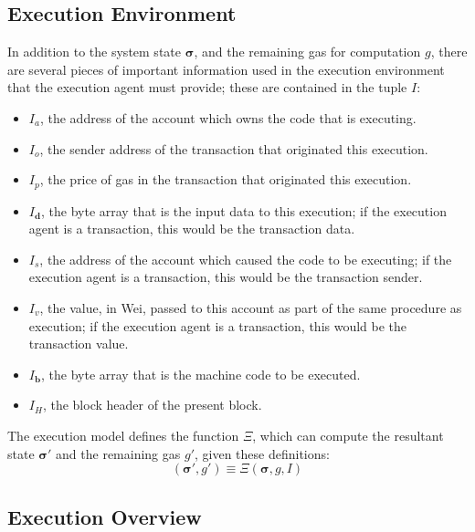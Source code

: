 \documentclass[9pt,oneside]{amsart}
\begin{document}
\begin{multicols}{2}
\subsection{Execution Environment}

In addition to the system state $\boldsymbol{\sigma}$, and the remaining gas for computation $g$, there are several pieces of important information used in the execution environment that the execution agent must provide; these are contained in the tuple $I$:

\begin{itemize}
\item $I_a$, the address of the account which owns the code that is executing.
\item $I_o$, the sender address of the transaction that originated this execution.
\item $I_p$, the price of gas in the transaction that originated this execution.
\item $I_\mathbf{d}$, the byte array that is the input data to this execution; if the execution agent is a transaction, this would be the transaction data.
\item $I_s$, the address of the account which caused the code to be executing; if the execution agent is a transaction, this would be the transaction sender.
\item $I_v$, the value, in Wei, passed to this account as part of the same procedure as execution; if the execution agent is a transaction, this would be the transaction value.
\item $I_\mathbf{b}$, the byte array that is the machine code to be executed.
\item $I_H$, the block header of the present block.
\end{itemize}

The execution model defines the function $\Xi$, which can compute the resultant state $\boldsymbol{\sigma}'$ and the remaining gas $g'$, given these definitions:
\begin{equation}
(\boldsymbol{\sigma}', g') \equiv \Xi(\boldsymbol{\sigma}, g, I)
\end{equation}

\subsection{Execution Overview}


\end{multicols}
\end{document}
